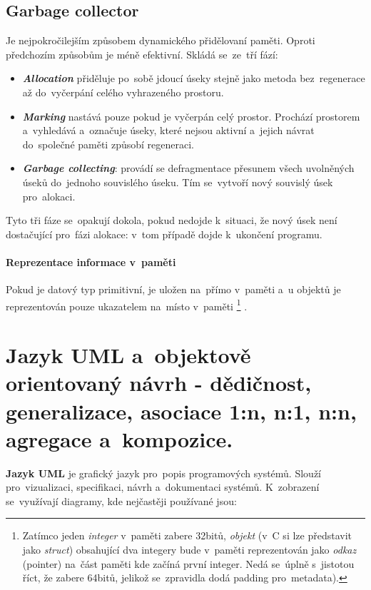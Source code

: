 \subsection{Garbage collector}

Je nejpokročilejším způsobem dynamického přidělovaní paměti. Oproti předchozím způsobům je méně efektivní. Skládá se~ze~tří fází:

\begin{itemize}
	\item \emph{\textbf{Allocation}} přiděluje po~sobě jdoucí úseky stejně jako metoda bez~regenerace až do~vyčerpání celého vyhrazeného prostoru.
	\item \emph{\textbf{Marking}} nastává pouze pokud je vyčerpán celý prostor. Prochází prostorem a~vyhledává a~označuje úseky, které nejsou aktivní a~jejich návrat do~společné paměti způsobí regeneraci.
	\item \emph{\textbf{Garbage collecting}}: provádí se defragmentace přesunem všech uvolněných úseků do~jednoho souvislého úseku. Tím se~vytvoří nový souvislý úsek pro~alokaci.
\end{itemize}

Tyto tři fáze se~opakují dokola, pokud nedojde k~situaci, že nový úsek není dostačující pro~fázi alokace: v~tom případě dojde k~ukončení programu.

\paragraph{Reprezentace informace v~paměti} Pokud je datový typ primitivní, je uložen na~přímo v~paměti a~u objektů je reprezentován pouze ukazatelem na~místo v~paměti%
\footnote{Zatímco jeden \textit{integer} v~paměti zabere 32bitů, \textit{objekt} (v~C si lze představit jako \textit{struct}) obsahující dva integery bude v~paměti reprezentován jako \textit{odkaz} (pointer) na~část paměti kde začíná první integer. Nedá se~úplně s~jistotou říct, že zabere 64bitů, jelikož se~zpravidla dodá padding pro~metadata).}%
.

\clearpage
\section{Jazyk UML a~objektově orientovaný návrh - dědičnost, generalizace, asociace 1:n, n:1, n:n, agregace a~kompozice.}

\textbf{Jazyk UML} je grafický jazyk pro~popis programových systémů. Slouží pro~vizualizaci, specifikaci, návrh a~dokumentaci systémů. K~zobrazení se~využívají diagramy, kde nejčastěji používané jsou:

